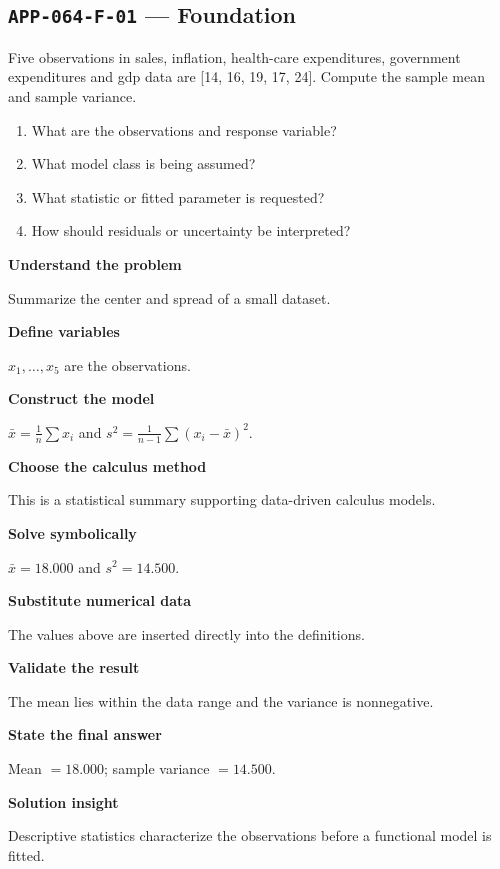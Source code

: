 \documentclass[11pt]{book}
\newcommand{\pid}[1]{\texttt{#1}}
\begin{document}
\subsection*{\pid{APP-064-F-01} — Foundation}
\begin{problembox}
Five observations in sales, inflation, health-care expenditures, government expenditures and gdp data are [14, 16, 19, 17, 24]. Compute the sample mean and sample variance.
\end{problembox}
\begin{promptbox}\begin{enumerate}
\item What are the observations and response variable?
\item What model class is being assumed?
\item What statistic or fitted parameter is requested?
\item How should residuals or uncertainty be interpreted?
\end{enumerate}\end{promptbox}
\begin{solutionbox}
\textbf{Understand the problem}\par Summarize the center and spread of a small dataset.\par\medskip
\textbf{Define variables}\par $x_1,\dots,x_5$ are the observations.\par\medskip
\textbf{Construct the model}\par $\bar x=\frac1n\sum x_i$ and $s^2=\frac1{n-1}\sum(x_i-\bar x)^2$.\par\medskip
\textbf{Choose the calculus method}\par This is a statistical summary supporting data-driven calculus models.\par\medskip
\textbf{Solve symbolically}\par $\bar x=18.000$ and $s^2=14.500$.\par\medskip
\textbf{Substitute numerical data}\par The values above are inserted directly into the definitions.\par\medskip
\textbf{Validate the result}\par The mean lies within the data range and the variance is nonnegative.\par\medskip
\textbf{State the final answer}\par Mean $=18.000$; sample variance $=14.500$.\par\medskip
\textbf{Solution insight}\par Descriptive statistics characterize the observations before a functional model is fitted.\par\medskip
\end{solutionbox}
\end{document}
